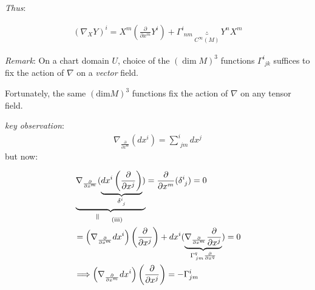 \documentclass[10pt]{amsart}
\begin{document}
\begin{multicols*}{2}
\emph{Thus}: 
	
	\[
	\begin{gathered}
	(\nabla_X Y)^i = X^m\left( \frac{\partial }{ \partial x^m} Y^i \right) + \Gamma^i_{\, \, nm} \underbrace{\cdot}_{C^{\infty}(M)} Y^n X^m
	\end{gathered}
	\]

\emph{Remark}: On a chart domain $U$, choice of the $(\dim{M})^3$ functions $\Gamma^i_{\,\,jk}$ suffices to fix the action of $\nabla$ on a \emph{vector} field. 

Fortunately, the same $(\text{dim}{M})^3$ functions fix the action of $\nabla$ on any tensor field. 

\emph{key observation}:
\[
\begin{gathered}
	\nabla_{\frac{\partial}{\partial x^m} }(dx^i) = \sum^i_{\, \, jm} dx^j
\end{gathered}
\]
but now: 
	
	
	
	\[
\begin{aligned}
& \underbrace{ \nabla_{  \frac{ \partial }{ \partial x^m} } ( \underbrace{ dx^i \left( \frac{ \partial }{ \partial x^j } \right) }_{ \delta^i_{ \, \, j} } ) }_{ \rotatebox{90}{$\,=$} \quad \, \text{ (iii) } }  = \frac{ \partial }{ \partial x^m} ( \delta^i_{ \, \, j} ) = 0  \\
& = \left( \nabla_{ \frac{ \partial }{ \partial x^m} } dx^i \right)\left( \frac{ \partial }{ \partial x^j} \right) + dx^i (   \underbrace{ \nabla_{ \frac{ \partial }{ \partial x^m } } \frac{ \partial }{ \partial x^j } }_{ \Gamma^q_{ \, jm }\frac{ \partial }{ \partial x^q} }   ) = 0 \\
& \Longrightarrow \left( \nabla_{ \frac{ \partial }{ \partial x^m } } dx^i \right)\left( \frac{ \partial }{ \partial x^j } \right) = - \Gamma^i_{ jm} 
\end{aligned}
\]


\end{multicols*}
\end{document}
